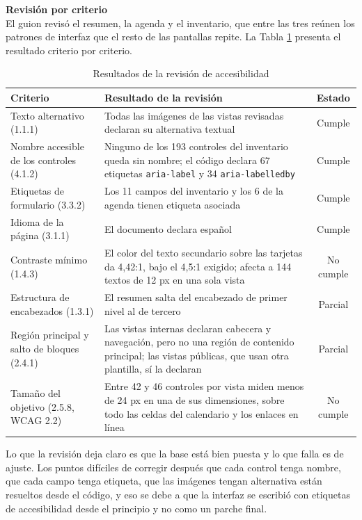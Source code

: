 \documentclass[12pt,letterpaper,oneside]{report}
\newcommand{\tituloparpegado}[1]{\par\textbf{#1}\\\indent\ignorespaces}
\begin{document}
\vspace{\parskip}
\tituloparpegado{Revisión por criterio}
El guion revisó el resumen, la agenda y el inventario, que entre las tres reúnen los patrones de interfaz que el resto de las pantallas repite. La Tabla \ref{tab:accesibilidad} presenta el resultado criterio por criterio.

\begin{table}[H]
  \centering
  \caption{Resultados de la revisión de accesibilidad}
  \label{tab:accesibilidad}
  \renewcommand{\arraystretch}{1.2}
  \footnotesize
  \begin{tabular}{|p{4.3cm}|p{7.4cm}|c|}
    \hline
    \textbf{Criterio} & \textbf{Resultado de la revisión} & \textbf{Estado} \\
    \hline
    Texto alternativo (1.1.1) & Todas las imágenes de las vistas revisadas declaran su alternativa textual & Cumple \\ \hline
    Nombre accesible de los controles (4.1.2) & Ninguno de los 193 controles del inventario queda sin nombre; el código declara 67 etiquetas \texttt{aria-label} y 34 \texttt{aria-labelledby} & Cumple \\ \hline
    Etiquetas de formulario (3.3.2) & Los 11 campos del inventario y los 6 de la agenda tienen etiqueta asociada & Cumple \\ \hline
    Idioma de la página (3.1.1) & El documento declara español & Cumple \\ \hline
    Contraste mínimo (1.4.3) & El color del texto secundario sobre las tarjetas da 4,42:1, bajo el 4,5:1 exigido; afecta a 144 textos de 12 px en una sola vista & No cumple \\ \hline
    Estructura de encabezados (1.3.1) & El resumen salta del encabezado de primer nivel al de tercero & Parcial \\ \hline
    Región principal y salto de bloques (2.4.1) & Las vistas internas declaran cabecera y navegación, pero no una región de contenido principal; las vistas públicas, que usan otra plantilla, sí la declaran & Parcial \\ \hline
    Tamaño del objetivo (2.5.8, WCAG 2.2) & Entre 42 y 46 controles por vista miden menos de 24 px en una de sus dimensiones, sobre todo las celdas del calendario y los enlaces en línea & No cumple \\ \hline
  \end{tabular}
\end{table}

Lo que la revisión deja claro es que la base está bien puesta y lo que falla es de ajuste. Los puntos difíciles de corregir después que cada control tenga nombre, que cada campo tenga etiqueta, que las imágenes tengan alternativa están resueltos desde el código, y eso se debe a que la interfaz se escribió con etiquetas de accesibilidad desde el principio y no como un parche final.
\end{document}
